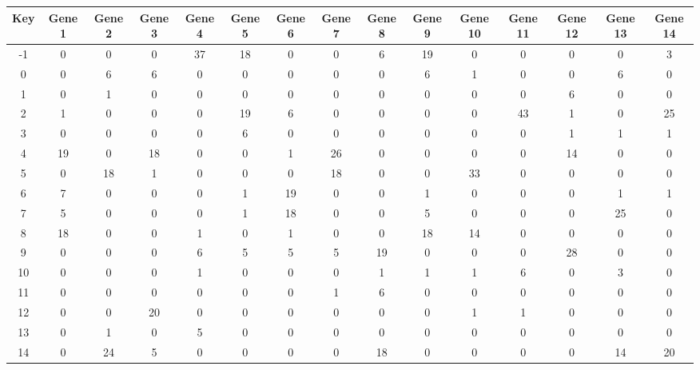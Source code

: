 \begin{tabular}{|c|c|c|c|c|c|c|c|c|c|c|c|c|c|c|}
\hline
Key & Gene 1 & Gene 2 & Gene 3 & Gene 4 & Gene 5 & Gene 6 & Gene 7 & Gene 8 & Gene 9 & Gene 10 & Gene 11 & Gene 12 & Gene 13 & Gene 14 \\
\hline
-1 & 0 & 0 & 0 & 37 & 18 & 0 & 0 & 6 & 19 & 0 & 0 & 0 & 0 & 3 \\
0 & 0 & 6 & 6 & 0 & 0 & 0 & 0 & 0 & 6 & 1 & 0 & 0 & 6 & 0 \\
1 & 0 & 1 & 0 & 0 & 0 & 0 & 0 & 0 & 0 & 0 & 0 & 6 & 0 & 0 \\
2 & 1 & 0 & 0 & 0 & 19 & 6 & 0 & 0 & 0 & 0 & 43 & 1 & 0 & 25 \\
3 & 0 & 0 & 0 & 0 & 6 & 0 & 0 & 0 & 0 & 0 & 0 & 1 & 1 & 1 \\
4 & 19 & 0 & 18 & 0 & 0 & 1 & 26 & 0 & 0 & 0 & 0 & 14 & 0 & 0 \\
5 & 0 & 18 & 1 & 0 & 0 & 0 & 18 & 0 & 0 & 33 & 0 & 0 & 0 & 0 \\
6 & 7 & 0 & 0 & 0 & 1 & 19 & 0 & 0 & 1 & 0 & 0 & 0 & 1 & 1 \\
7 & 5 & 0 & 0 & 0 & 1 & 18 & 0 & 0 & 5 & 0 & 0 & 0 & 25 & 0 \\
8 & 18 & 0 & 0 & 1 & 0 & 1 & 0 & 0 & 18 & 14 & 0 & 0 & 0 & 0 \\
9 & 0 & 0 & 0 & 6 & 5 & 5 & 5 & 19 & 0 & 0 & 0 & 28 & 0 & 0 \\
10 & 0 & 0 & 0 & 1 & 0 & 0 & 0 & 1 & 1 & 1 & 6 & 0 & 3 & 0 \\
11 & 0 & 0 & 0 & 0 & 0 & 0 & 1 & 6 & 0 & 0 & 0 & 0 & 0 & 0 \\
12 & 0 & 0 & 20 & 0 & 0 & 0 & 0 & 0 & 0 & 1 & 1 & 0 & 0 & 0 \\
13 & 0 & 1 & 0 & 5 & 0 & 0 & 0 & 0 & 0 & 0 & 0 & 0 & 0 & 0 \\
14 & 0 & 24 & 5 & 0 & 0 & 0 & 0 & 18 & 0 & 0 & 0 & 0 & 14 & 20 \\
\hline
\end{tabular}